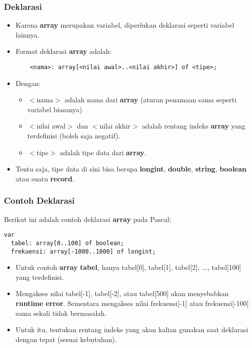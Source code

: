 \documentclass{beamer}
\begin{document}
\begin{frame}[fragile]
\frametitle{Deklarasi}
\begin{itemize}
    \item Karena \textbf{array} merupakan variabel, diperlukan deklarasi seperti variabel lainnya.
    \item Format deklarasi \textbf{array} adalah:
    \begin{lstlisting}
    <nama>: array[<nilai awal>..<nilai akhir>] of <tipe>;
    \end{lstlisting}
    \item Dengan:
    \begin{itemize}
        \item $<$nama$>$ adalah nama dari \textbf{array} (aturan penamaan sama seperti variabel biasanya)
        \item $<$nilai awal$>$ dan $<$nilai akhir$>$ adalah rentang indeks \textbf{array} yang terdefinisi (boleh saja negatif).
        \item $<$tipe$>$ adalah tipe data dari \textbf{array}.
    \end{itemize}
    \item Tentu saja, tipe data di sini bisa berupa \textbf{longint}, \textbf{double}, \textbf{string}, \textbf{boolean} atau suatu \textbf{record}.
\end{itemize}
\end{frame}

\begin{frame}[fragile]
\frametitle{Contoh Deklarasi}
Berikut ini adalah contoh deklarasi \textbf{array} pada Pascal:
\begin{lstlisting}
var
  tabel: array[0..100] of boolean;
  frekuensi: array[-1000..1000] of longint;
\end{lstlisting}
\begin{itemize}
    \item Untuk contoh \textbf{array} \textbf{tabel}, hanya tabel[0], tabel[1], tabel[2], ..., tabel[100] yang terdefinisi.
    \item Mengakses nilai tabel[-1], tabel[-2], atau tabel[500] akan menyebabkan \textbf{runtime error}. Sementara mengakses nilai frekuensi[-1] atau frekuensi[-100] sama sekali tidak bermasalah.
    \item Untuk itu, tentukan rentang indeks yang akan kalian gunakan saat deklarasi dengan tepat (sesuai kebutuhan).
\end{itemize}
\end{frame}
\end{document}
